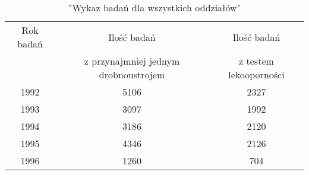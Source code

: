 \documentclass[a4paper,12pt]{article}
\begin{document}
\begin{table}[h]
\begin{center}
\caption{"Wykaz badań dla wszystkich oddziałów"}
\begin{tabular}{c|c|c}
\hline
Rok badań & Ilość badań & Ilość badań \\
& z przynajmniej jednym drobnoustrojem &z testem lekooporności \\
1992&5106&2327 \\
1993&3097&1992 \\
1994&3186&2120 \\
1995&4346&2126 \\
1996&1260&704 \\
\hline
\end{tabular}
\end{center}
\end{table}
\end{document}
